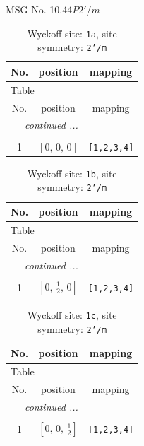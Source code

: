 \documentclass[fleqn,8pt]{jsarticle}
\begin{document}
\setcounter{MaxMatrixCols}{32}

\renewcommand{\tablename}{Table~}
\renewcommand{\figurename}{Figure~}
\begin{center}
\LARGE
MSG No. 10.44\quad$P2'/m$
\end{center}
\renewcommand{\arraystretch}{1.2}
\begin{longtable}{ccc}
\caption{Wyckoff site: {\tt 1a}, site symmetry: {\tt 2'/m}}
 \\
 \hline \hline
No. & position & mapping \\ \hline \endfirsthead

\multicolumn{2}{l}{\tablename\ \thetable{}} \\
 \hline \hline
No. & position & mapping \\ \hline \endhead

 \hline \hline
\multicolumn{2}{r}{\footnotesize\it continued ...} \\ \endfoot

 \hline \hline
\multicolumn{2}{r}{} \\ \endlastfoot

1 & $\left[ 0,\, 0,\, 0 \right]$ & {\tt [1,2,3,4]} \\
\end{longtable}
\renewcommand{\arraystretch}{1.2}
\begin{longtable}{ccc}
\caption{Wyckoff site: {\tt 1b}, site symmetry: {\tt 2'/m}}
 \\
 \hline \hline
No. & position & mapping \\ \hline \endfirsthead

\multicolumn{2}{l}{\tablename\ \thetable{}} \\
 \hline \hline
No. & position & mapping \\ \hline \endhead

 \hline \hline
\multicolumn{2}{r}{\footnotesize\it continued ...} \\ \endfoot

 \hline \hline
\multicolumn{2}{r}{} \\ \endlastfoot

1 & $\left[ 0,\, \frac{1}{2},\, 0 \right]$ & {\tt [1,2,3,4]} \\
\end{longtable}
\renewcommand{\arraystretch}{1.2}
\begin{longtable}{ccc}
\caption{Wyckoff site: {\tt 1c}, site symmetry: {\tt 2'/m}}
 \\
 \hline \hline
No. & position & mapping \\ \hline \endfirsthead

\multicolumn{2}{l}{\tablename\ \thetable{}} \\
 \hline \hline
No. & position & mapping \\ \hline \endhead

 \hline \hline
\multicolumn{2}{r}{\footnotesize\it continued ...} \\ \endfoot

 \hline \hline
\multicolumn{2}{r}{} \\ \endlastfoot

1 & $\left[ 0,\, 0,\, \frac{1}{2} \right]$ & {\tt [1,2,3,4]} \\
\end{longtable}
\end{document}
